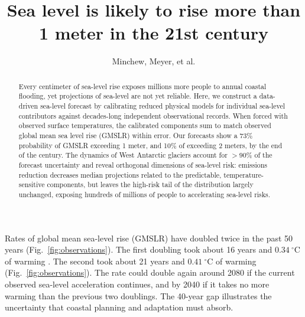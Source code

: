 \documentclass[12pt]{article}
\title{Sea level is likely to rise more than 1 meter in the 21st century}
\author{Minchew, Meyer, et al.}
\date{}
\begin{document}
\maketitle

\begin{abstract}

Every centimeter of sea-level rise exposes millions more people to annual coastal flooding, yet projections of sea-level are not yet reliable. Here, we construct a data-driven sea-level forecast by calibrating reduced physical models for individual sea-level contributors against decades-long independent observational records. When forced with observed surface temperatures, the calibrated components sum to match observed global mean sea level rise (GMSLR) within error. Our forecasts show a 73\% probability of GMSLR exceeding 1 meter, and 10\% of exceeding 2 meters, by the end of the century. The dynamics of West Antarctic glaciers account for $>90$\% of the forecast uncertainty and reveal orthogonal dimensions of sea-level risk: emissions reduction decreases median projections related to the predictable, temperature-sensitive components, but leaves the high-risk tail of the distribution largely unchanged, exposing hundreds of millions of people to accelerating sea-level risks.

\end{abstract}


Rates of global mean sea-level rise (GMSLR) have doubled twice in the past 50 years \citep{Frederikse2020,Hamlington2024} (Fig.~\ref{fig:observations}). The first doubling took about 16 years and $0.34\ ^\circ$C of warming \citep{Rohde2020}. The second took about 21 years and $0.41\ ^\circ$C of warming (Fig.~\ref{fig:observations}). The rate could double again around 2080 if the current observed sea-level acceleration continues, and by 2040 if it takes no more warming than the previous two doublings. The 40-year gap illustrates the uncertainty that coastal planning and adaptation must absorb.
\end{document}
